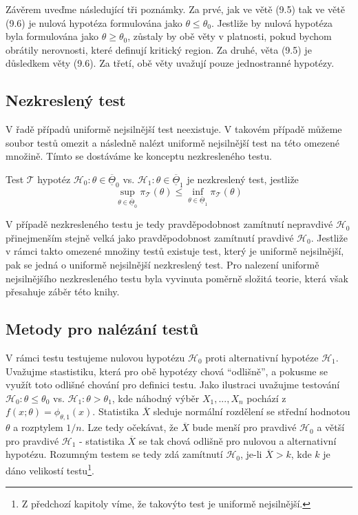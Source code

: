 Závěrem uveďme následující tři poznámky. Za prvé, jak ve větě (9.5) tak ve větě (9.6) je nulová hypotéza formulována jako $\theta \le \theta_0$. Jestliže by nulová hypotéza byla formulována jako $\theta \ge \theta_0$, zůstaly by obě věty v platnosti, pokud bychom obrátily nerovnosti, které definují kritický region. Za druhé, věta (9.5) je důsledkem věty (9.6). Za třetí, obě věty uvažují pouze jednostranné hypotézy.

\subsection{Nezkreslený test}

V řadě případů uniformě nejsilnější test neexistuje. V takovém případě můžeme soubor testů omezit a následně nalézt uniformě nejsilnější test na této omezené množině. Tímto se dostáváme ke konceptu nezkresleného testu.

\begin{definition}
Test $\mathscr{T}$ hypotéz $\mathscr{H}_0: \theta \in \overline{\underline{\Theta}}_0$ vs. $\mathscr{H}_1: \theta \in \overline{\underline{\Theta}}_1$ je nezkreslený test, jestliže
\begin{equation*}
\sup_{\theta \in \overline{\underline{\Theta}}_0} \pi_{\mathscr{T}}(\theta) \le \inf_{\theta \in \overline{\underline{\Theta}}_1}\pi_{\mathscr{T}}(\theta)
\end{equation*}
\end{definition}

V případě nezkresleného testu je tedy pravděpodobnost zamítnutí nepravdivé $\mathscr{H}_0$ přinejmenším stejně velká jako pravděpodobnost zamítnutí pravdivé $\mathscr{H}_0$. Jestliže v rámci takto omezené množiny testů existuje test, který je uniformě nejsilnější, pak se jedná o uniformě nejsilnější nezkreslený test. Pro nalezení uniformě nejsilnějšího nezkresleného testu byla vyvinuta poměrně složitá teorie, která však přesahuje záběr této knihy.

\subsection{Metody pro nalézání testů}

V rámci testu testujeme nulovou hypotézu $\mathscr{H}_0$ proti alternativní hypotéze $\mathscr{H}_1$. Uvažujme stastistiku, která pro obě hypotézy chová ``odlišně'', a pokusme se využít toto odlišné chování pro definici testu. Jako ilustraci uvažujme testování $\mathscr{H}_0: \theta \le \theta_0$ vs. $\mathscr{H}_1: \theta > \theta_1$, kde náhodný výběr $X_1, ..., X_n$ pochází z $f(x; \theta) = \phi_{\theta, 1}(x)$. Statistika $\overline{X}$ sleduje normální rozdělení se střední hodnotou $\theta$ a rozptylem $1/n$. Lze tedy očekávat, že $\overline{X}$ bude menší pro pravdivé $\mathscr{H}_0$ a větší pro pravdivé $\mathscr{H}_1$ - statistika $\overline{X}$ se tak chová odlišně pro nulovou a alternativní hypotézu. Rozumným testem se tedy zdá zamítnutí $\mathscr{H}_0$, je-li $\overline{X} > k$, kde $k$ je dáno velikostí testu\footnote{Z předchozí kapitoly víme, že takovýto test je uniformě nejsilnější.}.

